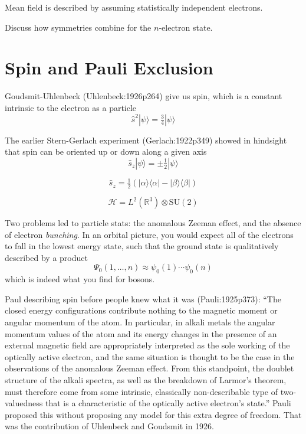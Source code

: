 Mean field is described by assuming statistically independent electrons.

Discuss how symmetries combine for the \(n\)-electron state.

\section{Spin and Pauli Exclusion}

Goudsmit-Uhlenbeck (Uhlenbeck:1926p264) give us spin, which is a constant intrinsic to the electron
as a particle
\begin{equation}
    \hat{s}^2
    |\psi\rangle
    =
    \tfrac{3}{4}
    |\psi\rangle
\end{equation}

The earlier Stern-Gerlach experiment (Gerlach:1922p349) showed in hindsight that
spin can be oriented up or down along a given axis
\begin{equation}
    \hat{s}_z
    |\psi\rangle
    =
    \pm
    \tfrac{1}{2}
    |\psi\rangle
\end{equation}

\begin{equation}
    \hat{s}_z
    =
    \tfrac{1}{2}
    (
        |\alpha\rangle\langle\alpha|
        -
        |\beta\rangle\langle\beta|
    )
\end{equation}

\begin{equation}
    \mathcal{H}
    =
    L^2(\mathbb{R}^3)
    \otimes
    \mathrm{SU}(2)
\end{equation}


Two problems led to particle stats: the anomalous Zeeman effect, and the absence
of electron {\itshape bunching}.
In an orbital picture, you would expect all of the electrons to fall in the
lowest energy state, such that the ground state is qualitatively described by a
product
\begin{equation}
    \Psi_0(1,\ldots,n)
    \approx
    \psi_0(1)
    \cdots
    \psi_0(n)
\end{equation}
which is indeed what you find for bosons.

Paul describing spin before people knew what it was (Pauli:1925p373):
``The closed energy configurations contribute nothing to the magnetic moment or
angular momentum of the atom.
In particular, in alkali metals the angular momentum values of the atom and its
energy changes in the presence of an external magnetic field are appropriately
interpreted as the sole working of the optically active electron, and the same
situation is thought to be the case in the observations of the anomalous Zeeman
effect.
From this standpoint, the doublet structure of the alkali spectra, as well as
the breakdown of Larmor's theorem, must therefore come from some intrinsic,
classically non-describable type of two-valuedness that is a characteristic of
the optically active electron's state.''
Pauli proposed this without proposing any model for this extra degree of
freedom.
That was the contribution of Uhlenbeck and Goudsmit in 1926.


